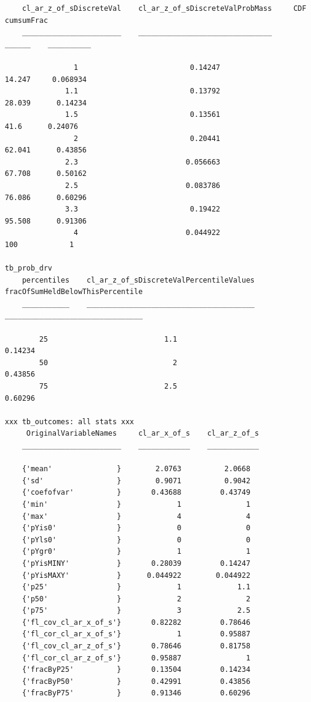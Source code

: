 \documentclass[
]{book}
\begin{document}
\begin{verbatim}
    cl_ar_z_of_sDiscreteVal    cl_ar_z_of_sDiscreteValProbMass     CDF      cumsumFrac
    _______________________    _______________________________    ______    __________

                1                          0.14247                14.247     0.068934 
              1.1                          0.13792                28.039      0.14234 
              1.5                          0.13561                  41.6      0.24076 
                2                          0.20441                62.041      0.43856 
              2.3                         0.056663                67.708      0.50162 
              2.5                         0.083786                76.086      0.60296 
              3.3                          0.19422                95.508      0.91306 
                4                         0.044922                   100            1 

tb_prob_drv
    percentiles    cl_ar_z_of_sDiscreteValPercentileValues    fracOfSumHeldBelowThisPercentile
    ___________    _______________________________________    ________________________________

        25                           1.1                                  0.14234             
        50                             2                                  0.43856             
        75                           2.5                                  0.60296             

xxx tb_outcomes: all stats xxx
     OriginalVariableNames     cl_ar_x_of_s    cl_ar_z_of_s
    _______________________    ____________    ____________

    {'mean'               }        2.0763          2.0668  
    {'sd'                 }        0.9071          0.9042  
    {'coefofvar'          }       0.43688         0.43749  
    {'min'                }             1               1  
    {'max'                }             4               4  
    {'pYis0'              }             0               0  
    {'pYls0'              }             0               0  
    {'pYgr0'              }             1               1  
    {'pYisMINY'           }       0.28039         0.14247  
    {'pYisMAXY'           }      0.044922        0.044922  
    {'p25'                }             1             1.1  
    {'p50'                }             2               2  
    {'p75'                }             3             2.5  
    {'fl_cov_cl_ar_x_of_s'}       0.82282         0.78646  
    {'fl_cor_cl_ar_x_of_s'}             1         0.95887  
    {'fl_cov_cl_ar_z_of_s'}       0.78646         0.81758  
    {'fl_cor_cl_ar_z_of_s'}       0.95887               1  
    {'fracByP25'          }       0.13504         0.14234  
    {'fracByP50'          }       0.42991         0.43856  
    {'fracByP75'          }       0.91346         0.60296  
\end{verbatim}
\end{document}
